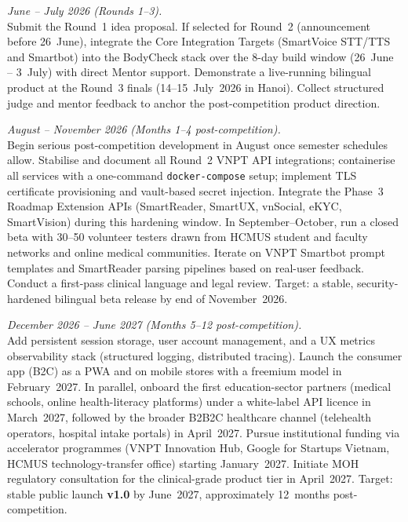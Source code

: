 \begin{description}[leftmargin=1em, style=nextline, itemsep=8pt, topsep=4pt]

  \item[\textbf{Phase 1 --- HackAIthon Competition}]
    \textit{June -- July 2026 (Rounds 1--3).}\\
    Submit the Round~1 idea proposal. If selected for Round~2
    (announcement before 26~June), integrate the Core Integration Targets
    (SmartVoice STT/TTS and Smartbot) into the BodyCheck stack over the
    8-day build window (26~June -- 3~July) with direct Mentor support.
    Demonstrate a live-running bilingual product at the Round~3 finals
    (14--15~July~2026 in Hanoi). Collect structured judge and mentor
    feedback to anchor the post-competition product direction.

  \item[\textbf{Phase 2 --- Hardening and Closed Beta}]
    \textit{August -- November 2026 (Months 1--4 post-competition).}\\
    Begin serious post-competition development in August once semester
    schedules allow. Stabilise and document all Round~2 VNPT API
    integrations; containerise all services with a one-command
    \texttt{docker-compose} setup; implement TLS certificate
    provisioning and vault-based secret injection. Integrate the
    Phase~3 Roadmap Extension APIs (SmartReader, SmartUX, vnSocial,
    eKYC, SmartVision) during this hardening window.
    In September--October, run a closed beta with 30--50 volunteer
    testers drawn from HCMUS student and faculty networks and online
    medical communities. Iterate on VNPT Smartbot prompt templates and
    SmartReader parsing pipelines based on real-user feedback. Conduct
    a first-pass clinical language and legal review.
    Target: a stable, security-hardened bilingual beta release by end of
    November~2026.

  \item[\textbf{Phase 3 --- Public Launch and Market Expansion}]
    \textit{December 2026 -- June 2027 (Months 5--12 post-competition).}\\
    Add persistent session storage, user account management, and a UX
    metrics observability stack (structured logging, distributed
    tracing). Launch the consumer app (B2C) as a PWA and on mobile
    stores with a freemium model in February~2027. In parallel,
    onboard the first education-sector partners (medical schools, online
    health-literacy platforms) under a white-label API licence in
    March~2027, followed by the broader B2B2C healthcare channel
    (telehealth operators, hospital intake portals) in April~2027.
    Pursue institutional funding via accelerator programmes
    (VNPT Innovation Hub, Google for Startups Vietnam, HCMUS
    technology-transfer office) starting January~2027.
    Initiate MOH regulatory consultation for the clinical-grade product
    tier in April~2027.
    Target: stable public launch \textbf{v1.0} by June~2027,
    approximately 12~months post-competition.

\end{description}

